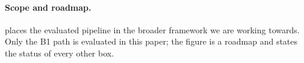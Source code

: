 \paragraph{Scope and roadmap.}  places the evaluated pipeline in the broader framework we are working towards. Only the B1 path is evaluated in this paper; the figure is a roadmap and states the status of every other box.

